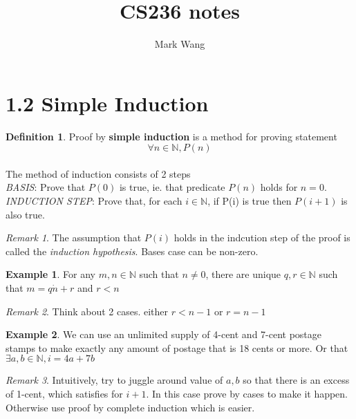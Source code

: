 \documentclass[11pt]{article}
\title{CS236 notes}
\author{Mark Wang}
\theoremstyle{plain}%
\theoremstyle{definition}
\newtheorem{defn}{Definition}
\newtheorem{exmp}{Example}[defn]
\theoremstyle{remark}
\newtheorem*{rem}{Remark}
\begin{document}
\maketitle


\section*{1.2 Simple Induction}




\begin{defn}
  \label{simple induction}
  Proof by \textbf{simple induction} is a method for proving statement
  \[
    \forall n\in \mathbb{N}, P(n)
  \]
  \\ The method of induction consists of 2 steps \\
  \textit{BASIS}: Prove that $P(0)$ is true, ie. that predicate $P(n)$ holds for $n=0$. \\
  \textit{INDUCTION STEP}: Prove that, for each $i\in \mathbb{N}$, if P(i) is true then $P(i+1)$ is also true. \\
  \begin{rem}
    The assumption that $P(i)$ holds in the indcution step of the proof is called the \textit{induction hypothesis}. Bases case can be non-zero.
  \end{rem}

  \begin{exmp}
    For any $m, n\in \mathbb{N}$ such that $n\neq 0$, there are unique $q,r\in \mathbb{N}$ such that $m=q\dot n + r$ and $r < n$

    \begin{rem}
      Think about 2 cases. either $r< n-1$ or $r=n-1$
    \end{rem}
  \end{exmp}

  \begin{exmp}
    We can use an unlimited supply of 4-cent and 7-cent postage stamps to make exactly any amount of postage that is 18 cents or more. Or that $\exists a,b\in \mathbb{N}, i=4a + 7b$

    \begin{rem}
      Intuitively, try to juggle around value of $a,b$ so that there is an excess of 1-cent, which satisfies for $i+1$. In this case prove by cases to make it happen. Otherwise use proof by complete induction which is easier.
    \end{rem}
  \end{exmp}
\end{defn}
\end{document}
